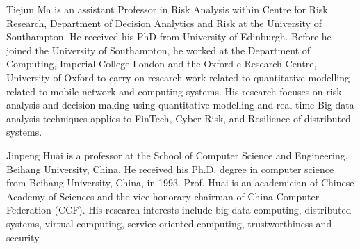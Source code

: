 \begin{IEEEbiography}{Tiejun Ma} is an assistant Professor in Risk Analysis within Centre for Risk Research, Department of Decision Analytics and Risk at the University of Southampton. He received his PhD from University of Edinburgh. Before he joined the University of Southampton, he worked at the Department of Computing, Imperial College London and the Oxford e-Research Centre, University of Oxford to carry on research work related to quantitative modelling related to mobile network and computing systems. His research focuses on risk analysis and decision-making using quantitative modelling and real-time Big data analysis techniques applies to FinTech, Cyber-Risk, and Resilience of distributed systems.
\end{IEEEbiography}

\begin{IEEEbiography}{Jinpeng Huai} is a professor at the School of Computer Science and Engineering, Beihang University, China. He received his Ph.D. degree in computer science from Beihang University, China, in 1993. Prof. Huai is an academician of Chinese Academy of Sciences and the vice honorary chairman of China Computer Federation (CCF). His research interests include big data computing, distributed systems, virtual computing, service-oriented computing, trustworthiness and security.
\end{IEEEbiography}
